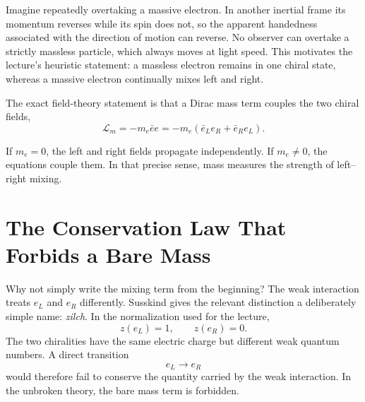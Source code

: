 Imagine repeatedly overtaking a massive electron. In another inertial frame its momentum reverses while its spin does not, so the apparent handedness associated with the direction of motion can reverse. No observer can overtake a strictly massless particle, which always moves at light speed. This motivates the lecture's heuristic statement: a massless electron remains in one chiral state, whereas a massive electron continually mixes left and right.

The exact field-theory statement is that a Dirac mass term couples the two chiral fields,
\begin{equation}
\mathcal L_m
=
-m_e\bar e e
=
-m_e
\left(
  \bar e_L e_R
  +
  \bar e_R e_L
\right).
\end{equation}

If $m_e=0$, the left and right fields propagate independently. If $m_e\ne0$, the equations couple them. In that precise sense, mass measures the strength of left--right mixing.

\section{The Conservation Law That Forbids a Bare Mass}

Why not simply write the mixing term from the beginning? The weak interaction treats $e_L$ and $e_R$ differently. Susskind gives the relevant distinction a deliberately simple name: \emph{zilch}. In the normalization used for the lecture,
\begin{equation}
z(e_L)=1,
\qquad
z(e_R)=0.
\end{equation}
The two chiralities have the same electric charge but different weak quantum numbers. A direct transition
\begin{equation}
e_L\longrightarrow e_R
\end{equation}
would therefore fail to conserve the quantity carried by the weak interaction. In the unbroken theory, the bare mass term is forbidden.



